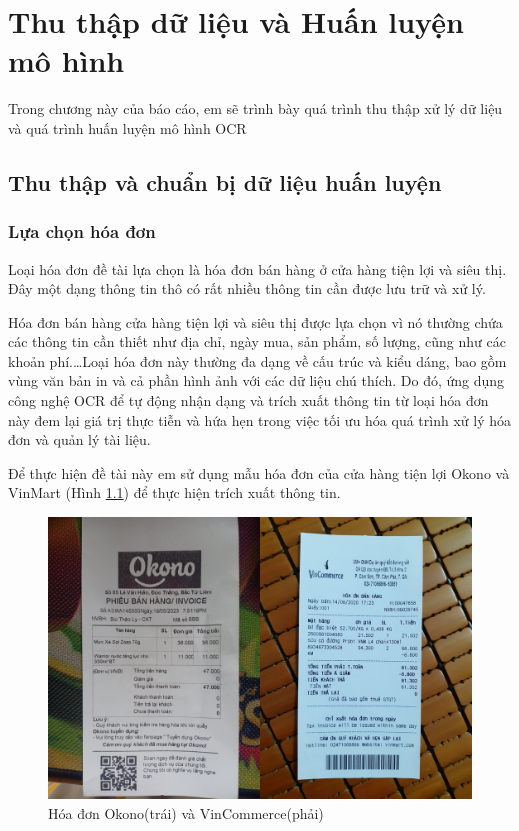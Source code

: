 \chapter{Thu thập dữ liệu và Huấn luyện mô hình} \label{data_train}

Trong chương này của báo cáo, em sẽ trình bày quá trình thu thập xử lý dữ liệu và quá trình huấn luyện mô hình OCR 
\section{Thu thập và chuẩn bị dữ liệu huấn luyện}
\subsection{Lựa chọn hóa đơn}
Loại hóa đơn đề tài lựa chọn là hóa đơn bán hàng ở cửa hàng tiện lợi và siêu thị. Đây một dạng thông tin thô có rất nhiều thông tin cần được lưu trữ và xử lý.

Hóa đơn bán hàng cửa hàng tiện lợi và siêu thị được lựa chọn vì nó thường chứa các thông tin cần thiết như địa chỉ, ngày mua, sản phẩm, số lượng, cũng như các khoản phí.\ldots Loại hóa đơn này thường đa dạng về cấu trúc và kiểu dáng, bao gồm vùng văn bản in và cả phần hình ảnh với các dữ liệu chú thích. Do đó, ứng dụng công nghệ OCR để tự động nhận dạng và trích xuất thông tin từ loại hóa đơn này đem lại giá trị thực tiễn và hứa hẹn trong việc tối ưu hóa quá trình xử lý hóa đơn và quản lý tài liệu.

Để thực hiện đề tài này em sử dụng mẫu hóa đơn của cửa hàng tiện lợi Okono và VinMart (Hình \ref{fig9-okono-vincom}) để thực hiện trích xuất thông tin.

\begin{figure}[h]
    \includegraphics[scale=0.20]{images/okono-vincom.png}
    \centering
    \caption{Hóa đơn Okono(trái) và VinCommerce(phải)}
    \label{fig9-okono-vincom}
\end{figure}

